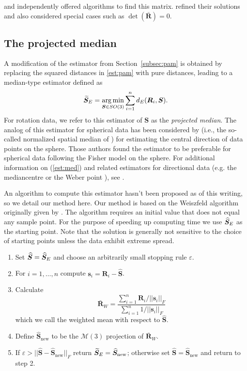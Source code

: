  \citet{arun87} and \citet{horn88} independently offered algorithms to find this matrix.  \citet{umeyama91} refined their solutions and also considered special cases such as $\det(\bar{\bm R})=0$.

\subsection{The projected median}
\label{subsec:med}

A modification of the estimator from Section~\ref{subsec:pam} is obtained by replacing the squared distances in \eqref{est:pam} with pure distances, leading to a median-type estimator defined as
\begin{equation}\label{est:med}
{\widetilde{\bm S}_E}=\operatorname*{arg\,min}_{\bm{S}\in
SO(3)}\sum_{i=1}^n{d_E}(\bm{R}_i,\bm{S}).
\end{equation}
For rotation data, we refer to this estimator of $\bm{S}$ as the \textit{projected median}.  
The analog of this estimator for spherical data has been considered by \citet{chan93} (i.e., the so-called normalized spatial median of \cite{ducharme87}) for estimating the central direction of data points on the sphere.   Those authors found the estimator to be preferable for spherical data following the Fisher model on the sphere. For additional information on (\ref{est:med}) and related estimators for directional data (e.g. the mediancentre \citep{gower74} or the Weber point \citep{bajaj88}),  see \citet{durocher09}. 

An algorithm to compute this estimator hasn't been proposed as of this writing, so we detail our method here.  Our method is based on the Weiszfeld algorithm originally given by \cite{weiszfeld37}.  The algorithm requires an initial value that does not equal any sample point. For the purpose of speeding up computing time we use ${\widehat{\bm S}_E}$ as the starting point. Note that the solution is generally not sensitive to the choice of starting points unless the data exhibit extreme spread.
\begin{enumerate}
\item Set $\widehat{\bm S}={\widehat{\bm S}_E}$ and choose an arbitrarily small stopping rule $\varepsilon$.
\item For $i=1,\ldots,n$ compute $\bm s_i=\bm R_i-\widehat{\bm S}$.
\item Calculate
\[
\bar{\bm R}_W=\frac{\sum_{i=1}^n\bm R_i/||\bm s_i||_F}{\sum_{i=1}^n1/||\bm s_i||_F}
\]
which we call the weighted mean with respect to $\widehat{\bm S}$.
\item Define $\widehat{\bm S}_{\text{new}}$ to be the $\mathcal{M}(3)$ projection of $\bar{\bm R}_W$.
\item If $\varepsilon>||\widehat{\bm S}-\widehat{\bm S}_{\text{new}}||_F$ return ${\widetilde{\bm S}_E}=\widehat{\bm S}_{\text{new}}$; otherwise set $\widehat{\bm S}=\widehat{\bm S}_{\text{new}}$ and return to step 2.
\end{enumerate}

